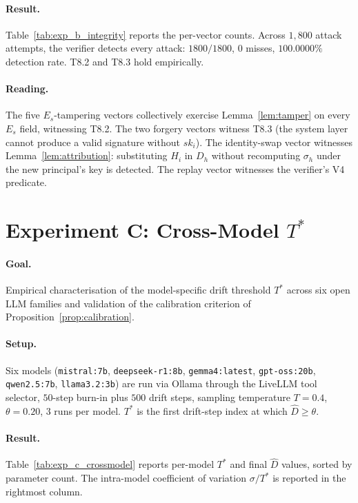 \documentclass[11pt]{article}
\newcommand{\Dhat}{\widehat{D}}
\newcommand{\Es}{E_s}
\newcommand{\Dh}{D_h}
\newcommand{\sigh}{\sigma_h}
\newcommand{\Hi}{H_i}
\newcommand{\ski}{sk_i}
\newcommand{\Tstar}{T^*}
\begin{document}
\paragraph{Result.} Table~\ref{tab:exp_b_integrity} reports the
per-vector counts. Across $1{,}800$ attack attempts, the verifier
detects every attack: $1800/1800$, $0$ misses, $100.0000\%$
detection rate. T8.2 and T8.3 hold empirically.



\paragraph{Reading.} The five $\Es$-tampering vectors collectively
exercise Lemma~\ref{lem:tamper} on every $\Es$ field, witnessing
T8.2. The two forgery vectors witness T8.3 (the system layer cannot
produce a valid signature without $\ski$). The identity-swap vector
witnesses Lemma~\ref{lem:attribution}: substituting $\Hi$ in $\Dh$
without recomputing $\sigh$ under the new principal's key is detected.
The replay vector witnesses the verifier's V4 predicate.

\section{Experiment C: Cross-Model $\Tstar$}
\label{sec:exp_c}

\paragraph{Goal.} Empirical characterisation of the model-specific
drift threshold $\Tstar$ across six open LLM families and validation
of the calibration criterion of Proposition~\ref{prop:calibration}.

\paragraph{Setup.} Six models (\texttt{mistral:7b},
\texttt{deepseek-r1:8b}, \texttt{gemma4:latest}, \texttt{gpt-oss:20b},
\texttt{qwen2.5:7b}, \texttt{llama3.2:3b}) are run via Ollama through
the LiveLLM tool selector, $50$-step burn-in plus $500$ drift steps,
sampling temperature $T = 0.4$, $\theta = 0.20$, $3$ runs per model.
$\Tstar$ is the first drift-step index at which $\Dhat \geq \theta$.

\paragraph{Result.} Table~\ref{tab:exp_c_crossmodel} reports per-model
$\Tstar$ and final $\Dhat$ values, sorted by parameter count. The
intra-model coefficient of variation $\sigma/\Tstar$ is reported in
the rightmost column.
\end{document}
